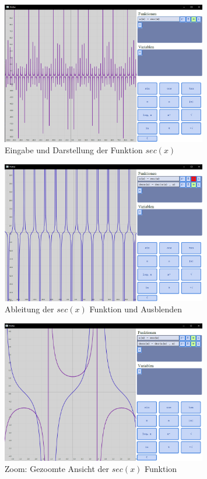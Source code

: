 \documentclass[a4paper]{article}
\begin{document}
\begin{figure}[ht]
	\centering
	\includegraphics[width=0.8\textwidth]{Resources/eingabe_darstellung.png}
	\caption{Eingabe und Darstellung der Funktion $sec(x)$}
	\label{fig:eingabe_darstellung}
\end{figure}

\begin{figure}[ht]
	\centering
	\includegraphics[width=0.8\textwidth]{Resources/anwendung.png}
	\caption{Ableitung der $sec(x)$ Funktion und Ausblenden}
	\label{fig:anwendung}
\end{figure}

\begin{figure}[ht]
	\centering
	\includegraphics[width=0.8\textwidth]{Resources/zoom.png}
	\caption{Zoom: Gezoomte Ansicht der $sec(x)$ Funktion}
	\label{fig:zoom}
\end{figure}
\end{document}

